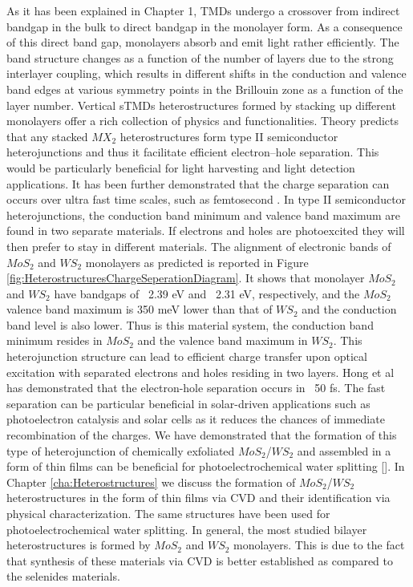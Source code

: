 As it has been explained in Chapter 1, TMDs undergo a crossover from indirect bandgap in the bulk to direct bandgap in the monolayer form. As a consequence of this direct band gap, monolayers absorb and emit light rather efficiently. The band structure changes as a function of the number of layers due to the strong interlayer coupling, which results in different shifts in the conduction and valence band edges at various symmetry points in the Brillouin zone as a function of the layer number.  Vertical sTMDs heterostructures formed by stacking up different monolayers offer a rich collection of physics and functionalities. Theory predicts that any stacked $MX_2$ heterostructures form type II semiconductor heterojunctions and thus it facilitate efficient electron–hole separation. This would be particularly beneficial for light harvesting and light detection applications. It has been further demonstrated that the charge separation can occurs over ultra fast time scales, such as femtosecond \cite{Hong2014}.
In type II semiconductor heterojunctions, the conduction band minimum and valence band maximum are found in two separate materials. If electrons and holes are photoexcited they will then prefer to stay in different materials. The alignment of electronic bands of $MoS_2$ and $WS_2$ monolayers as predicted \cite{Gong2013} is reported in Figure \ref{fig:HeterostructuresChargeSeperationDiagram}. It shows that monolayer $MoS_2$ and $WS_2$ have bandgaps of ~2.39 eV and ~2.31 eV, respectively, and the $MoS_2$ valence band maximum is 350 meV lower than that of $WS_2$ and the conduction band level is also lower. Thus is this material system, the conduction band minimum resides in $MoS_2$ and the valence band maximum in $WS_2$. This heterojunction structure can lead to efficient charge transfer upon optical excitation with separated electrons and holes residing in two layers. Hong et al has demonstrated that the electron-hole separation occurs in ~50 fs. The fast separation can be particular beneficial in solar-driven applications such as photoelectron catalysis and solar cells as it reduces the chances of immediate recombination of the charges.
We have demonstrated that the formation of this type of heterojunction of chemically exfoliated $MoS_2$/$WS_2$ and assembled in a form of thin films can be beneficial for photoelectrochemical water splitting []. In Chapter \ref{cha:Heterostructures} we discuss the formation of $MoS_2$/$WS_2$ heterostructures in the form of thin films via CVD and their identification via physical characterization. The same structures have been used for photoelectrochemical water splitting. In general, the most studied bilayer heterostructures is formed by $MoS_2$ and $WS_2$ monolayers. This is due to the fact that synthesis of these materials via CVD is better established as compared to the selenides materials. 

